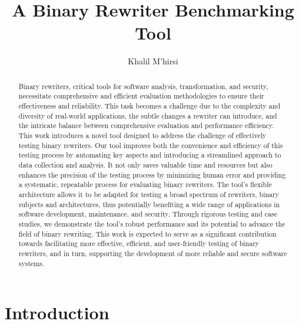 \documentclass[a4paper,11pt,oneside]{report}
\title{A Binary Rewriter Benchmarking Tool}
\author{Khalil M'hirsi}
\begin{document}
\maketitle
\makededication
\makeacks

\begin{abstract}
    Binary rewriters, critical tools for software analysis, transformation, and security,
    necessitate comprehensive and efficient evaluation methodologies to ensure their
    effectiveness and reliability. This task becomes a challenge due to the complexity and
    diversity of real-world applications, the subtle changes a rewriter can introduce, and the
    intricate balance between comprehensive evaluation and performance efficiency. This work
    introduces a novel tool designed to address the challenge of effectively testing binary
    rewriters. Our tool improves both the convenience and efficiency of this testing process by
    automating key aspects and introducing a streamlined approach to data collection and
    analysis. It not only saves valuable time and resources but also enhances the precision of the
    testing process by minimizing human error and providing a systematic, repeatable process
    for evaluating binary rewriters.
    The tool's flexible architecture allows it to be adapted for testing a broad spectrum of
    rewriters, binary subjects and architectures, thus potentially benefiting a wide range of
    applications in software development, maintenance, and security. Through rigorous testing
    and case studies, we demonstrate the tool's robust performance and its potential to
    advance the field of binary rewriting. This work is expected to serve as a significant
    contribution towards facilitating more effective, efficient, and user-friendly testing of binary
    rewriters, and in turn, supporting the development of more reliable and secure software
    systems.
\end{abstract}

\maketoc

\chapter{Introduction}
\end{document}
